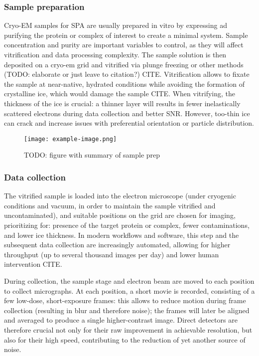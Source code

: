 \subsubsection{Sample preparation}
Cryo-EM samples for SPA are usually prepared in vitro by expressing ad purifying the protein or complex of interest to create a minimal system. Sample concentration and purity are important variables to control, as they will affect vitrification and data processing complexity. The sample solution is then deposited on a cryo-em grid and vitrified via plunge freezing or other methods (TODO: elaborate or just leave to citation?) CITE. Vitrification allows to fixate the sample at near-native, hydrated conditions while avoiding the formation of crystalline ice, which would damage the sample CITE. When vitrifying, the thickness of the ice is crucial: a thinner layer will results in fewer inelastically scattered electrons during data collection and better SNR. However, too-thin ice can crack and increase issues with preferential orientation or particle distribution.

\begin{figure}[ht]
    \centering
    \texttt{[image: example-image.png]}
    \caption{TODO: figure with summary of sample prep}
    \label{fig:sample_prep}
\end{figure}

\subsubsection{Data collection}
The vitrified sample is loaded into the electron microscope (under cryogenic conditions and vacuum, in order to maintain the sample vitrified and uncontaminated), and suitable positions on the grid are chosen for imaging, prioritizing for: presence of the target protein or complex, fewer contaminations, and lower ice thickness. In modern workflows and software, this step and the subsequent data collection are increasingly automated, allowing for higher throughput (up to several thousand images per day) and lower human intervention CITE.

During collection, the sample stage and electron beam are moved to each position to collect micrographs. At each position, a short movie is recorded, consisting of a few low-dose, short-exposure frames: this allows to reduce motion during frame collection (resulting in blur and therefore noise); the frames will later be aligned and averaged to produce a single higher-contrast image. Direct detectors are therefore crucial not only for their raw improvement in achievable resolution, but also for their high speed, contributing to the reduction of yet another source of noise.

